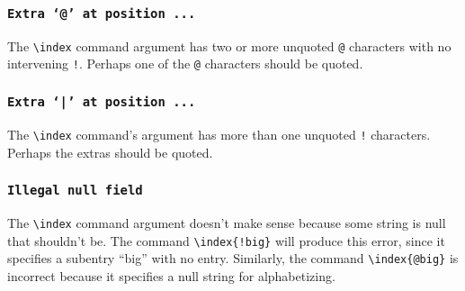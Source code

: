 \subsubsection*{\tt Extra `@' at position ...}

The \verb|\index| command argument has two or more unquoted \verb|@|
characters with no intervening \verb|!|.  Perhaps one of the \verb|@|
characters should be quoted.

\subsubsection*{\tt Extra `|' at position ...}

The \verb|\index| command's argument has more than one unquoted \verb|!|
characters.  Perhaps the extras should be quoted.

\subsubsection*{\tt Illegal null field}

The \verb|\index| command argument doesn't make sense because some
string is null that shouldn't be.  The command \verb|\index{!big}| will
produce this error, since it specifies a subentry ``big'' with no
entry.  Similarly, the command \verb|\index{@big}| is incorrect because
it specifies a null string for alphabetizing.

%
%
%
%
%

